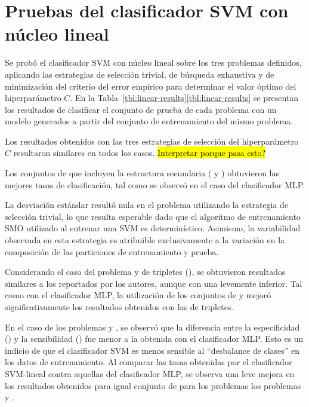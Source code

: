 %
%
%
\section{Pruebas del clasificador SVM con núcleo lineal}
%
Se probó el clasificador SVM con núcleo lineal sobre los tres
problemas definidos, aplicando las estrategias de selección trivial,
de búsqueda exhaustiva y de minimización del criterio del error
empírico para determinar el valor óptimo del hiperparámetro $C$.
En la \iflatexml{}Tabla~\ref{tbl:linear-results}\else\autoref{tbl:linear-results}\fi{}
se presentan los resultados de clasificar el conjunto de prueba de
cada problema con un modelo generados a partir del conjunto de
entrenamiento del mismo problema.

Los resultados obtenidos con las tres estrategias de selección del
hiperparámetro $C$ resultaron similares en todos los casos.
\hl{Interpretar porque pasa esto?}

Los conjuntos de  que incluyen la estructura secundaria
( y ) obtuvieron las mejores tasas de clasificación,
tal como se observó en el caso del clasificador MLP.

La desviación estándar resultó nula en el problema \prob{\tripletsvm}
utilizando la estrategia de selección trivial, lo que resulta
esperable dado que el algoritmo de entrenamiento SMO utilizado al
entrenar una SVM es determinístico.
Asimismo, la variabilidad observada en esta estrategia es atribuible
exclusivamente a la variación en la composición de las particiones de
entrenamiento y prueba.

Considerando el caso del problema \prob\tripletsvm{} y  de
tripletes (), se obtuvieron resultados similares a los
reportados por los autores, aunque con una \SP{} levemente inferior.
Tal como con el clasificador MLP, la utilización de los conjuntos de
  y  mejoró significativamente los
resultados obtenidos con las  de tripletes.

En el caso de los problemas \prob\mipred{} y \prob\micropred{}, se
observó que la diferencia entre la especificidad (\SP) y la
sensibilidad (\SE) fue menor a la obtenida con el clasificador MLP.
Esto es un indicio de que el clasificador SVM es menos sensible al
``desbalance de clases'' en los datos de entrenamiento.
Al comparar las tasas obtenidas por el clasificador SVM-lineal
contra aquellas del clasificador MLP, se observa una leve mejora en
los resultados obtenidos para igual conjunto de  para los
problemas los problemas \mipred{} y \micropred{}.
